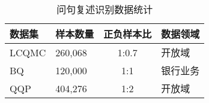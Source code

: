 \begin{table}
    \caption{问句复述识别数据统计}
    \centering
    \newcommand{\tabincell}[2]{\begin{tabular}{@{}#1@{}}#2\end{tabular}}
    \begin{tabular}{llcl}
        \hline
        \textbf{数据集} & \textbf{样本数量} & \textbf{正负样本比} & \textbf{数据领域}\\
        \hline
        LCQMC & 260,068 & 1:0.7 & 开放域\\
        
        BQ & 120,000 & 1:1 & 银行业务\\
        
        QQP & 404,276 & 1:2 & 开放域\\
        \hline
    \end{tabular}


    \label{table2-4}
\end{table}
